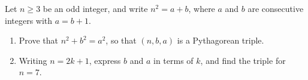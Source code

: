 Let $n\ge3$ be an odd integer, and write $n^2=a+b$, where $a$ and $b$ are consecutive integers with $a=b+1$.
\begin{enumerate}
\item[(a)] Prove that $n^2+b^2=a^2$, so that $(n,b,a)$ is a Pythagorean triple.
\item[(b)] Writing $n=2k+1$, express $b$ and $a$ in terms of $k$, and find the triple for $n=7$.
\end{enumerate}
